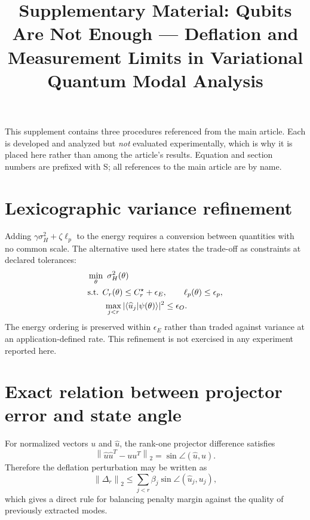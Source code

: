 \documentclass[journal]{IEEEtran}
\newcommand{\norm}[1]{\left\lVert #1\right\rVert}
\begin{document}
\title{Supplementary Material: Qubits Are Not Enough --- Deflation and Measurement
Limits in Variational Quantum Modal Analysis}
\maketitle

\noindent This supplement contains three procedures referenced from the main article.
Each is developed and analyzed but \emph{not} evaluated experimentally, which is why it
is placed here rather than among the article's results. Equation and section numbers are
prefixed with \textsf{S}; all references to the main article are by name.

\section{Lexicographic variance refinement}
\label{app:lexico}
Adding $\gamma\sigma_H^2+\zeta\ell_p$ to the energy requires a conversion between quantities with no common
scale. The alternative used here states the trade-off as constraints at declared tolerances:
\begin{equation}
\begin{aligned}
&\min_{\theta}\ \sigma_H^2(\theta)\\
&\text{s.t. }C_r(\theta)\le C_r^\star+\epsilon_E,\qquad
\ell_p(\theta)\le\epsilon_p,\\
&\hspace{2.0em}\max_{j<r}|\langle\widehat u_j|\psi(\theta)\rangle|^2\le\epsilon_O.
\end{aligned}
\label{eq:lexico}
\end{equation}
The energy ordering is preserved within $\epsilon_E$ rather than traded against variance at an
application-defined rate. This refinement is not exercised in any experiment reported here.

\section{Exact relation between projector error and state angle}
For normalized vectors $u$ and $\widehat u$, the rank-one projector difference satisfies
\begin{equation}
\norm{\widehat u\widehat u^T-uu^T}_2=\sin\angle(\widehat u,u).
\label{eq:projectorangle}
\end{equation}
Therefore the deflation perturbation may be written as
\begin{equation}
\norm{\Delta_r}_2\le
\sum_{j<r}\beta_j\sin\angle(\widehat u_j,u_j),
\label{eq:anglepert}
\end{equation}
which gives a direct rule for balancing penalty margin against the quality of previously extracted modes.
\end{document}
